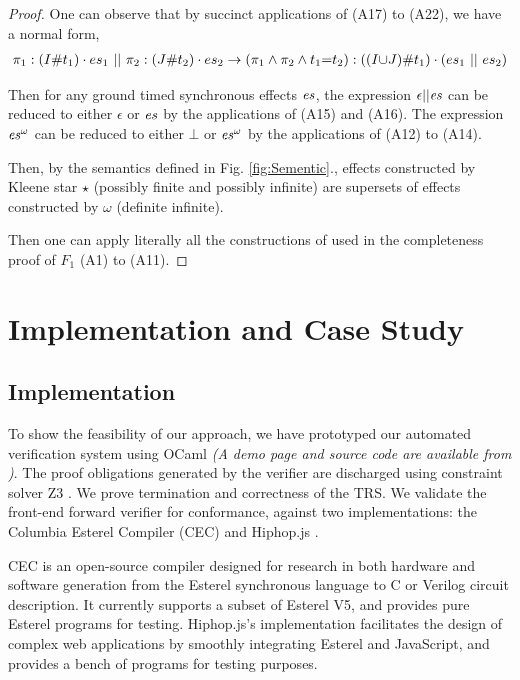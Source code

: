 \documentclass[acmsmall,review,anonymous]{acmart}\settopmatter{printfolios=true,printccs=false,printacmref=false}
\newcommand{\es}{\textcolor{black}{\ensuremath{{es}}}}
\newcommand{\code}[1]{{\tt{\ensuremath{\m{#1}}}}}
\newcommand{\m}{\mathit}
\newcommand\figref[1]{Fig. \textcolor{black}{\ref{#1}}.}
\begin{document}
\begin{proof} 
One can observe that by succinct applications of (A17) to (A22), we have a normal form, 
\begin{align}
\pi_1 : (I\# t_1) \cdot \es_1\ ||\ \pi_2 :  (J\# t_2) \cdot\es_2 \rightarrow  (\pi_1 \wedge \pi_2 \wedge t_1{=}t_2) :  ((I  {\cup} J) \# t_1) \cdot (\es_1\ ||\ \es_2)
\end{align}

Then for any ground timed synchronous effects \code{\es}, the expression \code{\epsilon || \es} can be reduced to either \code{\epsilon} or \code{\es} by the applications of (A15) and (A16).  
The expression \code{\es^\omega} can be reduced to either \code{\bot} or \code{\es^\omega} by the applications of (A12) to (A14).  

Then, by the semantics defined in \figref{fig:Sementic}, effects constructed by Kleene star \code{\star} (possibly finite and possibly infinite) are supersets of effects constructed by \code{\omega} (definite infinite). 

Then one can apply literally all the constructions of \cite{salomaa1966two} used in the completeness proof of \code{F_1} (A1) to (A11).


\end{proof}




\section{Implementation and Case Study}
\label{sec:Evaluation}

\subsection{Implementation}
To show the feasibility of our approach, we have prototyped our automated verification system 
using OCaml \emph{(A demo page  and source code are available from \cite{CODE})}. 
The proof obligations generated by the verifier are discharged using constraint solver Z3 \citep{de2008z3}. 
We prove termination and correctness of the TRS. We validate the front-end forward verifier for conformance, against two implementations: the Columbia Esterel Compiler (CEC) 
\cite{CEC} and Hiphop.js \cite{HH_im}. 


CEC is an open-source compiler designed for research in both hardware and software generation from the Esterel synchronous language to C or Verilog circuit description. It currently supports a subset of Esterel V5, and provides pure Esterel programs for testing. Hiphop.js's implementation facilitates the design of complex web applications by smoothly integrating Esterel and JavaScript, and provides a bench of programs for testing purposes. 
\end{document}
